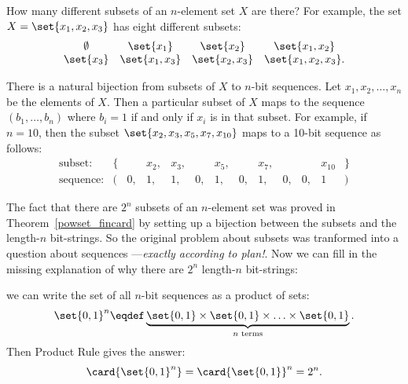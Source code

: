 How many different subsets of an $n$-element set $X$ are there?  For
example, the set $X = \set{x_1, x_2, x_3}$ has eight different subsets:
%
\[
\begin{array}{cccc}
\emptyset & \set{x_1} & \set{x_2} & \set{x_1, x_2} \\
\set{x_3} & \set{x_1, x_3} & \set{x_2, x_3} & \set{x_1, x_2, x_3}.
\end{array}
\]

There is a natural bijection from subsets of $X$ to $n$-bit sequences.
Let $x_1, x_2, \ldots, x_n$ be the elements of $X$.  Then a particular
subset of $X$ maps to the sequence $(b_1, \ldots, b_n)$ where $b_i =
1$ if and only if $x_i$ is in that subset.  For example, if $n = 10$,
then the subset $\set{x_2, x_3, x_5, x_7, x_{10}}$ maps to a 10-bit
sequence as follows:
%
\[
\begin{array}{rrrrrrrrrrrrr}
\text{subset:} &
\{ &    & x_2, & x_3, &    & x_5, &   & x_7, &    &    & x_{10} & \} \\
\text{sequence:} &
(  & 0, &   1, &   1, & 0, &   1, & 0, &   1, & 0, & 0, &        1 & )
\end{array}
\]
\fi

The fact that there are $2^n$ subsets of an $n$-element set was proved
in Theorem~\ref{powset_fincard} by setting up a bijection between the
subsets and the length-$n$ bit-strings.  So the original problem about
subsets was tranformed into a question about sequences
---\emph{exactly according to plan!}.  Now we can fill in the missing
explanation of why there are $2^n$ length-$n$ bit-strings:
\iffalse
Now if we answer the sequence
question, then we've solved our original problem as well.

But how many different $n$-bit sequences are there?  For example,
there are 8 different 3-bit sequences:
%
\[
\begin{array}{ccccccc}
(0,0,0) & \quad & (0,0,1) & \quad & (0,1,0) & \quad & (0,1,1) \\
(1,0,0) & \quad & (1,0,1) & \quad & (1,1,0) & \quad & (1,1,1)
\end{array}
\]

Well,\fi
we can write the set of all $n$-bit sequences as a product of
sets:
%
\[
\set{0,1}^n \eqdef \underbrace{\set{0,1} \times \set{0,1} \times
        \ldots \times \set{0,1}}_{\text{$n$ terms}}.
\]
%
Then Product Rule gives the answer:
%
\[
\card{\set{0,1}^n} = \card{\set{0,1}}^n  = 2^n.
\]


\iffalse
This means that the number of subsets of an $n$-element set $X$ is
also $2^n$.  We'll put this answer to use shortly.
\fi

